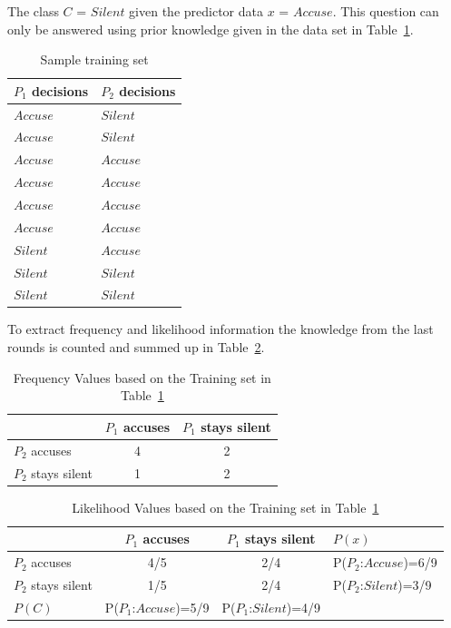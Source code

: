 \documentclass{acm_proc_article-sp}
\begin{document}
The class $C$ = $Silent$ given the predictor data $x$ = $Accuse$. 
This question can only be answered using prior knowledge given in the data set in Table~\ref{tab:training-set}.

\begin{table}
\centering
\begin{tabular}{l | l }
 $P_1$ decisions & $P_2$ decisions \\
  \hline
$Accuse$&$Silent$\\
  \hline
$Accuse$&$Silent$\\
  \hline
$Accuse$&$Accuse$\\
  \hline
$Accuse$&$Accuse$\\
  \hline
$Accuse$&$Accuse$\\
  \hline
$Accuse$&$Accuse$\\
\hline
$Silent$&$Accuse$\\
\hline
$Silent$&$Silent$\\
\hline
$Silent$&$Silent$\\
\end{tabular}
\caption{Sample training set}
\label{tab:training-set}
\end{table}

To extract frequency and likelihood information the knowledge from the
last rounds is counted and summed up in Table~\ref{tab:frequency-val}.

\begin{table}
\centering
\begin{tabular}{l | c | c}
                     & $P_1$ accuses    & $P_1$ stays silent \\
  \hline
  $P_2$ accuses      & 4 				& 2 				 \\
  \hline
  $P_2$ stays silent & 1 				& 2   				 \\
\end{tabular}
\caption{Frequency Values based on the Training set in Table~\ref{tab:training-set}}
\label{tab:frequency-val}
\end{table}

\begin{table}
\centering
\begin{tabular}{l | c | c | l}
                     & $P_1$ accuses       & $P_1$ stays silent  & $P(x)$ \\
  \hline
  $P_2$ accuses      & 4/5   	 & 2/4	   &  P($P_2$:$Accuse$)=6/9 	  \\
  \hline
  $P_2$ stays silent & 1/5		 & 2/4 	   &  P($P_2$:$Silent$)=3/9 	  \\
  \hline
  $P(C)$ 			 & P($P_1$:$Accuse$)=5/9 & P($P_1$:$Silent$)=4/9 &    \\
  \end{tabular}
\caption{Likelihood Values based on the Training set in Table~\ref{tab:training-set}}
\label{tab:likelihood-val}
\end{table}
\end{document}
